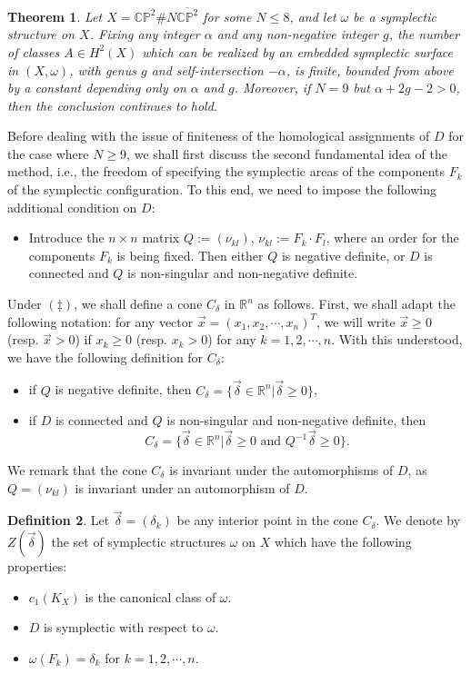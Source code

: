 \documentclass[11pt]{amsart}
\theoremstyle{plain}
\newtheorem{theorem}{Theorem}
\numberwithin{theorem}{section}
\theoremstyle{definition}
\newtheorem{definition}[theorem]{Definition}
\newcommand{\C}{{\mathbb C}}
\newcommand{\R}{{\mathbb R}}
\renewcommand{\P}{{\mathbb P}}
\begin{document}
\begin{theorem}
Let $X=\C\P^2\# N\overline{\C\P^2}$ for some $N\leq 8$, and let $\omega$ be a symplectic structure on $X$. 
Fixing any integer $\alpha$ and any non-negative integer $g$, the number of classes $A\in H^2(X)$ which can be realized by an embedded symplectic surface in $(X,\omega)$, with genus $g$ and self-intersection $-\alpha$, 
is finite, bounded from above by a constant depending only on $\alpha$ and $g$. Moreover, if $N=9$ but
$\alpha+2g-2>0$, then the conclusion continues to hold. 
\end{theorem}

Before dealing with the issue of finiteness of the homological assignments of $D$ for the case where $N\geq 9$, we shall first discuss the second fundamental idea of the method, i.e., the freedom of specifying the symplectic areas of the components $F_k$ of the symplectic configuration.  To this end, we need to impose the following additional condition on $D$: 
\begin{itemize}
\item [{(\ddag)}] Introduce the $n\times n$ matrix $Q:=(\nu_{kl})$, $\nu_{kl}:=F_k\cdot F_l$,
where an order for the components $F_k$ is being fixed. Then either $Q$ is negative definite, or $D$ is connected and $Q$ is non-singular and non-negative definite. 
\end{itemize}

Under $(\ddag)$, we shall define a cone $C_\delta$ in $\R^n$ as follows. First, we shall adapt the following notation: for any vector $\vec{x}=(x_1,x_2,\cdots,x_n)^T$, we will write $\vec{x}\geq 0$ (resp. $\vec{x}>0$) if $x_k\geq 0$ 
(resp. $x_k>0$) for any $k=1,2,\cdots,n$. With this understood, we have the following definition for $C_\delta$:

\begin{itemize}
\item if $Q$ is negative definite, then $C_\delta=\{\vec{\delta}\in\R^n|\vec{\delta}\geq 0\}$, 
\item if $D$ is connected and $Q$ is non-singular and non-negative definite, then
$$
C_\delta=\{\vec{\delta}\in\R^n|\vec{\delta}\geq 0 \mbox{ and } Q^{-1}\vec{\delta}\geq 0\}.
$$
\end{itemize}
We remark that the cone $C_\delta$ is invariant under the automorphisms of $D$, as $Q=(\nu_{kl})$ is invariant 
under an automorphism of $D$.

\begin{definition}
Let $\vec{\delta}=(\delta_k)$ be any interior point in the cone $C_\delta$. We denote by $Z(\vec{\delta})$ the set of symplectic structures $\omega$ on $X$ which have the following properties: 
\begin{itemize}
\item $c_1(K_X)$ is the canonical class of $\omega$.
\item $D$ is symplectic with respect to $\omega$.
\item $\omega(F_k)=\delta_k$ for $k=1,2,\cdots,n$. 
\end{itemize}
\end{definition}
\end{document}

